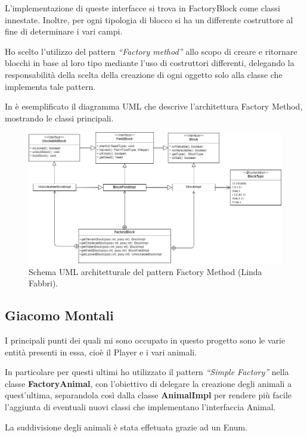 \documentclass[a4paper,12pt]{report}
\begin{document}
L’implementazione di queste interfacce si trova in FactoryBlock come classi innestate. Inoltre, per ogni tipologia di blocco si ha un differente costruttore al fine di determinare i vari campi. 

Ho scelto l’utilizzo del pattern \textit{“Factory method”} allo scopo di creare e ritornare blocchi in base al loro tipo mediante l’uso di costruttori differenti, delegando la responsabilità della scelta della creazione di ogni oggetto solo alla classe che implementa tale pattern.

In  è esemplificato il diagramma UML che descrive l'architettura Factory Method, mostrando le classi principali.

\hfill\break
\begin{figure}[!htb]
	\centerline{\includegraphics[scale=.5]{img/UML_FactoryLinda.png}}	
	\caption{Schema UML architetturale del pattern Factory Method (Linda Fabbri).}
	\label{img:LindaFabbri_Factory}
\end{figure}

\subsection{Giacomo Montali}

I principali punti dei quali mi sono occupato in questo progetto sono le varie entità presenti in essa, cioè il Player e i vari animali. 

In particolare per questi ultimi ho utilizzato il pattern \textit{“Simple Factory”}  nella classe \textbf{FactoryAnimal}, con l’obiettivo di delegare la creazione degli animali a quest’ultima, separandola così dalla classe \textbf{AnimalImpl} per  rendere più facile l'aggiunta di eventuali nuovi classi che implementano l'interfaccia Animal. 

La suddivisione degli animali è stata effetuata grazie ad un Enum.
\end{document}
